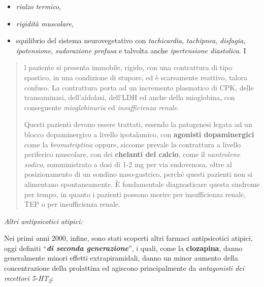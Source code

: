 \documentclass[]{article}
\begin{document}
\begin{itemize}
\item
  \emph{rialzo termico},
\item
  \emph{rigidità muscolare},
\item
  squilibrio del sistema neurovegetativo con \emph{tachicardia},
  \emph{tachipnea}, \emph{disfagia}, \emph{ipotensione},
  \emph{sudorazione profusa} e talvolta anche \emph{ipertensione
  diastolica}. I
\end{itemize}

\begin{quote}
l paziente si presenta immobile, rigido, con una contrattura di tipo
spastico, in una condizione di stupore, ed è scarsamente reattivo,
talora confuso. La contrattura porta ad un incremento plasmatico di CPK,
delle transaminasi, dell'aldolasi, dell'LDH ed anche della mioglobina,
con conseguente \emph{mioglobinuria} ed \emph{insufficienza renale}.

Questi pazienti devono essere trattati, essendo la patogenesi legata ad
un blocco dopaminergico a livello ipotalamico, con \textbf{agonisti
dopaminergici} come la \emph{bromotriptina} oppure, siccome prevale la
contrattura a livello periferico muscolare, con dei \textbf{chelanti del
calcio}, come il \emph{nantrolene sodico}, somministrato a dosi di 1-2
mg per via endovenosa, oltre al posizionamento di un sondino
naso-gastrico, perché questi pazienti non si alimentano spontaneamente.
È fondamentale diagnosticare questa sindrome per tempo, in quanto i
pazienti possono morire per insufficienza renale, TEP o per
insufficienza renale.
\end{quote}

\emph{\emph{Altri antipsicotici atipici:}}

Nei primi anni 2000, infine, sono stati scoperti altri farmaci
antipsicotici atipici, oggi definiti ``\textbf{\emph{di seconda
generazione}}'', i quali, come la \textbf{clozapina}, danno generalmente
minori effetti extrapiramidali, danno un minor aumento della
concentrazione della prolattina ed agiscono principalmente da
\emph{antagonisti dei recettori 5-HT\textsubscript{2}}:
\end{document}
